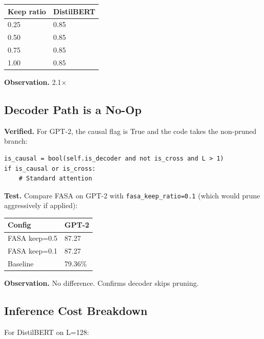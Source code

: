 \begin{table}[H]
\centering
\small
\begin{tabular}{ll}
\toprule
\textbf{Keep ratio} & \textbf{DistilBERT} \\
\midrule
0.25 & 0.85 \\
0.50 & 0.85 \\
0.75 & 0.85 \\
1.00 & 0.85 \\
\bottomrule
\end{tabular}
\end{table}

\textbf{Observation.} 2.1$\times$

\subsection{Decoder Path is a No-Op}

\textbf{Verified.} For GPT-2, the causal flag is True and the code takes the 
non-pruned branch:

\begin{lstlisting}
is_causal = bool(self.is_decoder and not is_cross and L > 1)
if is_causal or is_cross:
    # Standard attention
\end{lstlisting}

\textbf{Test.} Compare FASA on GPT-2 with \texttt{fasa\_keep\_ratio=0.1} (which would 
prune aggressively if applied):

\begin{table}[H]
\centering
\small
\begin{tabular}{ll}
\toprule
\textbf{Config} & \textbf{GPT-2} \\
\midrule
FASA keep=0.5 & 87.27 \\
FASA keep=0.1 & 87.27 \\
Baseline & 79.36\% \\
\bottomrule
\end{tabular}
\end{table}

\textbf{Observation.} No difference. Confirms decoder skips pruning.

\subsection{Inference Cost Breakdown}

For DistilBERT on L=128:

